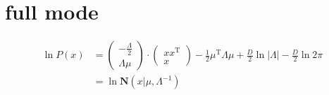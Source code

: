 \documentclass{article}
\begin{document}
\section{full mode}
$$
\begin{aligned}
\ln P(x)& =
\left(
    \begin{aligned}
        - \frac{\Lambda}{2}\\
        \Lambda \mu
    \end{aligned}
\right)
\cdot
\left(
    \begin{aligned}
        xx^\mathrm{T}\\
        x
    \end{aligned}
\right) -\frac{1}{2}\mu ^ \mathrm{T} \Lambda \mu + \frac{D}{2} \ln |\Lambda| - \frac{D}{2} \ln2\pi \\
& = \ln\textbf{N}(x|\mu,\Lambda^{-1})
\end{aligned}
$$
\end{document}
